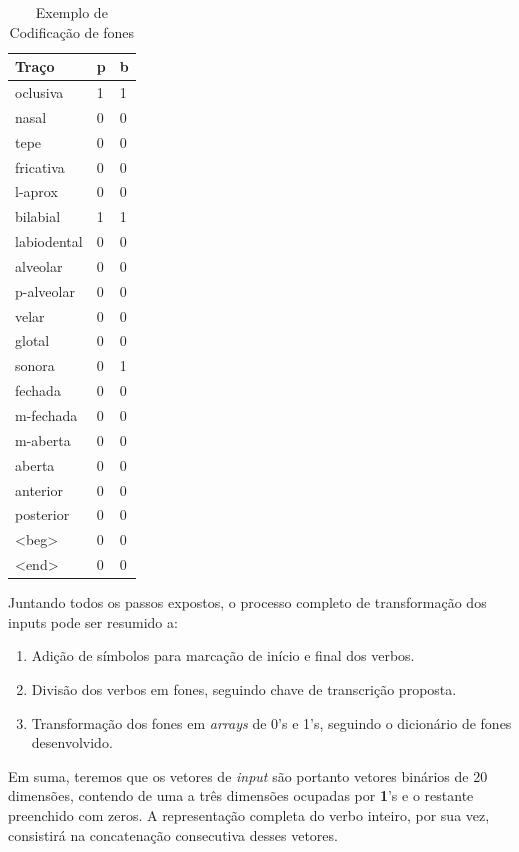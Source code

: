 \begin{table}[H]
\begin{center}
\begin{tabular}{lll}
\textbf{ Traço} & \textbf{p} &\textbf{ b} \\
 \toprule
oclusiva & 1 & 1 \\
nasal & 0 & 0 \\
tepe & 0 & 0 \\
fricativa & 0 & 0 \\
l-aprox & 0 & 0 \\
bilabial & 1 & 1 \\
labiodental & 0 & 0 \\
alveolar & 0 & 0 \\
p-alveolar & 0 & 0 \\
velar & 0 & 0 \\
glotal & 0 & 0 \\
sonora & 0 & 1 \\
fechada & 0 & 0 \\
m-fechada & 0 & 0 \\
m-aberta & 0 & 0 \\
aberta & 0 & 0 \\
anterior & 0 & 0 \\
posterior & 0 & 0 \\
<beg> & 0 & 0 \\
<end> & 0 & 0
\end{tabular}
\end{center}
\caption{Exemplo de Codificação de fones}
\label{tab:coding_example}
\end{table}

Juntando todos os passos expostos, o processo completo de transformação dos inputs pode ser resumido a:

\begin{enumerate}
    \item Adição de símbolos para marcação de início e final dos verbos.
    \item Divisão dos verbos em fones, seguindo chave de transcrição proposta.
    \item Transformação dos fones em \textit{arrays} de 0's e 1's, seguindo o dicionário de fones desenvolvido.
\end{enumerate}

Em suma, teremos que os vetores de \textit{input} são portanto vetores binários de 20 dimensões, contendo de uma a três dimensões ocupadas por \textbf{1}'s e o restante preenchido com zeros. A representação completa do verbo inteiro, por sua vez, consistirá na concatenação consecutiva desses vetores.






